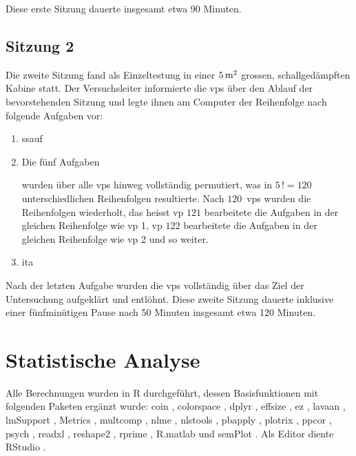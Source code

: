 \documentclass[11pt, twoside, a4paper]{book}		%
\begin{document}
\noindent Diese erste Sitzung dauerte insgesamt etwa 90 Minuten.

\subsection{Sitzung 2}
Die zweite Sitzung fand als Einzeltestung in einer $5\,\textnormal{m}^2$ grossen, schallgedämpften Kabine statt. 
Der Versuchsleiter informierte die \glspl{vp} über den Ablauf der bevorstehenden Sitzung und legte ihnen am Computer der Reihenfolge nach folgende Aufgaben vor:

\begin{enumerate}
	\item	\gls{ssauf}
	\item	Die fünf Aufgaben
			wurden über alle \glspl{vp} hinweg vollständig permutiert, was in $5\,! = 120$ unterschiedlichen Reihenfolgen resultierte. Nach $120$~\glspl{vp} wurden die Reihenfolgen wiederholt, das heisst  \gls{vp} $121$ bearbeitete die Aufgaben in der gleichen Reihenfolge wie \gls{vp} 1, \gls{vp} $122$ bearbeitete die Aufgaben in der gleichen Reihenfolge wie \gls{vp} 2 und so weiter.
	\item	\gls{ita}
\end{enumerate}

Nach der letzten Aufgabe wurden die \glspl{vp} vollständig über das Ziel der Untersuchung aufgeklärt und entlöhnt. Diese zweite Sitzung dauerte inklusive einer fünfminütigen Pause nach 50 Minuten insgesamt etwa 120 Minuten.



\section{Statistische Analyse \label{sec:StatistischeAnalyse}}

Alle Berechnungen wurden in R \citep{R} durchgeführt, dessen Basisfunktionen mit folgenden Paketen ergänzt wurde:
{coin} \citep{coin},
colorspace \citep{colorspace},
dplyr \citep{dplyr},
effsize \citep{effsize},
ez \citep{ez},
lavaan \citep{lavaan},
lmSupport \citep{lmSupport},
Metrics \citep{Metrics},		%
multcomp \citep{multcomp},
nlme \citep{nlme},
nlstools \citep{nlstools},
pbapply \citep{pbapply},
plotrix \citep{plotrix},
ppcor \citep{ppcor},
psych \citep{psych},
readxl \citep{readxl},
reshape2 \citep{reshape2},
rprime \citep{rprime},
R.matlab \citep{R.matlab} und
semPlot \citep{semPlot} .
Als Editor diente RStudio \citep{RStudio}.
\end{document}

